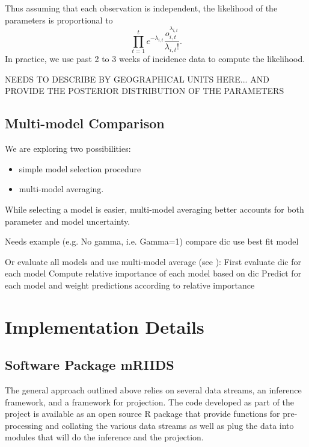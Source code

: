 \documentclass[11pt,]{article}
\begin{document}
Thus assuming that each observation is independent, the likelihood of the parameters is proportional to
\[
\prod_{t = 1}^{t}{e^{-\lambda_{i, t}} \frac{o_{i, t}^{\lambda_{i, t}}}{\lambda_{i, t} !}}.
\]
In practice, we use past 2 to 3 weeks of incidence data to compute the
likelihood.

NEEDS TO DESCRIBE BY GEOGRAPHICAL UNITS HERE... AND PROVIDE THE POSTERIOR DISTRIBUTION OF THE PARAMETERS

\subsection{Multi-model Comparison}

We are exploring two possibilities:

\begin{itemize}
\item simple model selection procedure
\item  multi-model averaging.
\end{itemize}

While selecting a model is easier, multi-model averaging better
accounts for both parameter and model uncertainty.

Needs example (e.g. No gamma, i.e. Gamma=1) compare dic use best fit model

Or evaluate all models and use multi-model average (see \cite{burnham2011aic}):  
First evaluate dic for each model
Compute relative importance of each model based on dic
Predict for each model and weight predictions according to relative importance




\section{Implementation Details}
\subsection{Software Package mRIIDS}

The general approach outlined above relies on several data streams, an
inference framework, and a framework for projection. The code
developed as part of the project is available as an open
source R package that provide functions for pre-processing and
collating the various data streams as well as plug the data into
modules that will do the inference and the projection. 
\end{document}
